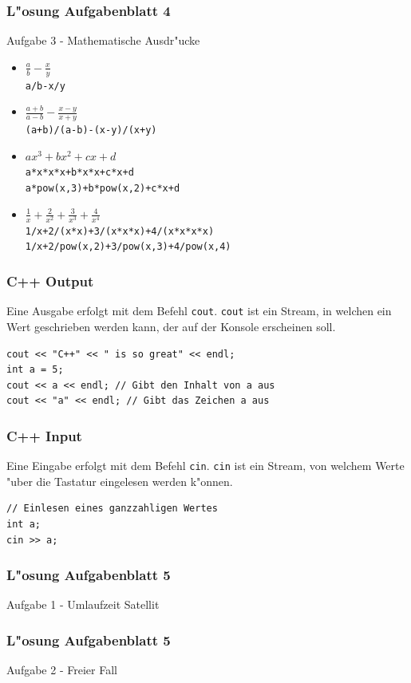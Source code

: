 \documentclass{beamer}
\begin{document}
\begin{frame}[fragile]
	\frametitle{L"osung Aufgabenblatt 4}
	Aufgabe 3 - Mathematische Ausdr"ucke
	\begin{itemize}
	\item $\frac{a}{b} - \frac{x}{y}$\\
	\verb|a/b-x/y|
	\item $\frac{a+b}{a-b} - \frac{x-y}{x+y}$\\
	\verb|(a+b)/(a-b)-(x-y)/(x+y)|
	\item $ax^{3}+bx^{2}+cx+d$\\
	\verb|a*x*x*x+b*x*x+c*x+d|\\
	\verb|a*pow(x,3)+b*pow(x,2)+c*x+d|
	\item $\frac{1}{x}+\frac{2}{x^{2}}+\frac{3}{x^{3}}+\frac{4}{x^{4}}$\\
	\verb|1/x+2/(x*x)+3/(x*x*x)+4/(x*x*x*x)|\\
	\verb|1/x+2/pow(x,2)+3/pow(x,3)+4/pow(x,4)|
\end{itemize}

\end{frame}

\begin{frame}[fragile]
	\frametitle{C++ Output}
	Eine Ausgabe erfolgt mit dem Befehl \verb|cout|. \verb|cout| ist ein Stream, in
	welchen ein Wert geschrieben werden kann, der auf der Konsole
	erscheinen soll.
	\begin{lstlisting}
cout << "C++" << " is so great" << endl;
int a = 5;
cout << a << endl; // Gibt den Inhalt von a aus
cout << "a" << endl; // Gibt das Zeichen a aus
	\end{lstlisting}
\end{frame}

\begin{frame}[fragile]
	\frametitle{C++ Input}
	Eine Eingabe erfolgt mit dem Befehl \verb|cin|. \verb|cin| ist ein Stream, von
	welchem Werte "uber die Tastatur eingelesen werden k"onnen.
	\begin{lstlisting}
// Einlesen eines ganzzahligen Wertes
int a;
cin >> a;
	\end{lstlisting}
\end{frame}

\begin{frame}[fragile]
	\frametitle{L"osung Aufgabenblatt 5}
	Aufgabe 1 - Umlaufzeit Satellit
	{\tiny
	
	}
\end{frame}

\begin{frame}[fragile]
	\frametitle{L"osung Aufgabenblatt 5}
	Aufgabe 2 - Freier Fall
	{\tiny
	
	}
\end{frame}
\end{document}
